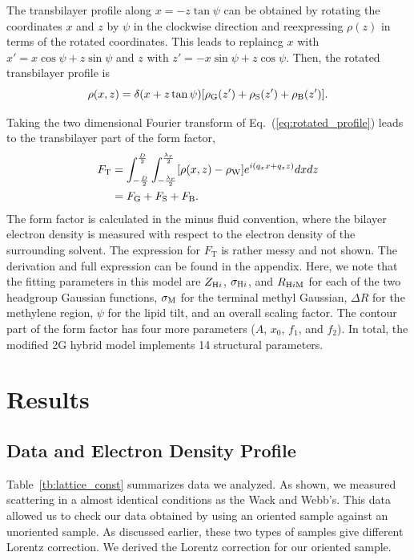 The transbilayer profile along $x=-z\tan\psi$ can be obtained by rotating
the coordinates $x$ and $z$ by $\psi$ in the clockwise direction and
reexpressing $\rho(z)$ in terms of the rotated coordinates. This leads
to replaincg $x$ with $x'=x\cos\psi+z\sin\psi$ and
$z$ with $z'=-x\sin\psi+z\cos\psi$. Then, the rotated transbilayer profile is
\begin{equation}
  \rho(x,z) = \delta(x+z\tan\psi)\mathopen{}\left[ \rho_\mathrm{G}(z') + \rho_\mathrm{S}(z') + \rho_\mathrm{B}(z') \right]\mathclose{}.
  \label{eq:rotated_profile}
\end{equation}

Taking the two dimensional Fourier transform of Eq.~(\ref{eq:rotated_profile})
leads to the transbilayer part of the form factor,
\begin{align}
  F_\mathrm{T} 
  &= \int_{-\frac{D}{2}}^{\frac{D}{2}} \int_{-\frac{\lambda_r}{2}}^{\frac{\lambda_r}{2}} 
     \mathopen{}\left[ \rho(x,z)-\rho_\mathrm{W} \right]\mathclose{} e^{i(q_xx+q_zz)} dxdz \\
  &= F_\mathrm{G} + F_\mathrm{S} + F_\mathrm{B}.
\end{align}
The form factor is calculated in the minus fluid convention, 
where the bilayer electron density
is measured with respect to the electron density of the surrounding solvent.
The expression for $F_\mathrm{T}$ is rather messy and not shown. 
The derivation and full expression can be found in the appendix. Here, 
we note that
the fitting parameters in this model are $Z_{\mathrm{H}i}$, $\sigma_{\mathrm{H}i}$, and 
$R_{\mathrm{H}i\mathrm{M}}$ for each of the two headgroup Gaussian functions, $\sigma_\mathrm{M}$ for
the terminal methyl Gaussian, $\Delta R$ for the methylene region, $\psi$ for
the lipid tilt, and an overall scaling factor. The contour part of the 
form factor has four more parameters ($A$, $x_0$, $f_1$, and $f_2$).
In total, the modified 2G hybrid model implements 14 structural parameters.


\section{Results}
\subsection{Data and Electron Density Profile}
Table~\ref{tb:lattice_const} summarizes data we analyzed. 
As shown, we measured scattering in a almost identical conditions as the
Wack and Webb's. This data allowed us to check our data obtained by using
an oriented sample against an unoriented sample. As discussed earlier, 
these two types of samples give different Lorentz correction. We derived
the Lorentz correction for our oriented sample. 

